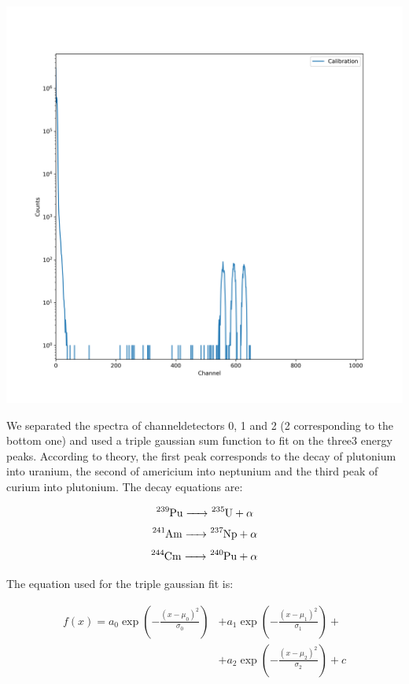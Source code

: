 \documentclass{article}
\begin{document}
\begin{multicols}{2}
\begin{center}
    \label{TT_21}
    \centering
    \includegraphics[scale = 0.35]{../../images/Calib.png}
\end{center}

We separated the spectra of channeldetectors 0, 1 and 2 (2 corresponding to the bottom one) and used a triple gaussian sum function to fit on the three3 energy peaks. According to theory, the first peak corresponds to the decay of plutonium into uranium, the second of americium into neptunium and the third peak of curium into plutonium. The decay equations are:

\begin{equation}
    \ce{ ^{239}Pu -> ^{235}U + \alpha} 
\end{equation}
\begin{equation}
    \ce{ ^{241}Am -> ^{237}Np + \alpha}
\end{equation} 
\begin{equation}
    \ce{ ^{244}Cm -> ^{240}Pu + \alpha}
\end{equation}

The equation used for the triple gaussian fit is:


\begin{equation}
    \begin{split}
    f(x) = a_0\exp{\left(-\frac{(x-\mu_0)^2}{\sigma_0}\right)} &+ a_1\exp{\left(-\frac{(x-\mu_1)^2}{\sigma_1}\right)} + \\
    &+ a_2\exp{\left(-\frac{(x-\mu_2)^2}{\sigma_2}\right)} + c
    \end{split}
    \label{eq:califit}
\end{equation}



\end{multicols}
\end{document}
